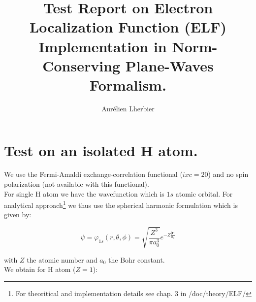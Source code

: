 \documentclass[a4paper,12pt]{report}
\title{Test Report on Electron Localization Function (ELF) Implementation in Norm-Conserving Plane-Waves Formalism.}
\author{Aur\'{e}lien Lherbier}
\begin{document}
\maketitle

\chapter{Test on an isolated H atom.}
\label{chapter1}

We use the Fermi-Amaldi exchange-correlation functional ($ixc=20$) and no spin polarization (not available with this functional).\\
For single H atom we have the wavefunction which is $1s$ atomic orbital.
For analytical approach\footnote{For theoritical and implementation details see chap. $3$ in /doc/theory/ELF/} we thus use the spherical harmonic formulation which is given by:

\begin{equation}
\psi = \varphi_{1s}(r,\theta,\phi) = \sqrt{\frac{Z^3}{\pi a_0^3}} e^{-Z \frac{\vert \mathbf{r} \vert}{a_0}}
\end{equation}

with $Z$ the atomic number and $a_0$ the Bohr constant.\\
We obtain for H atom ($Z=1$):\\
\end{document}
